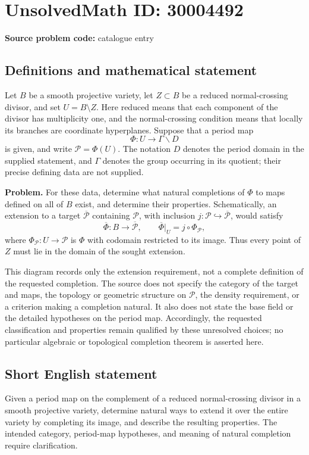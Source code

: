 \documentclass[11pt]{article}
\begin{document}
\section*{UnsolvedMath ID: 30004492}
\textbf{Source problem code:} catalogue entry
\subsection{Definitions and mathematical statement}
Let \(B\) be a smooth projective variety, let \(Z\subset B\) be a reduced normal-crossing divisor, and set \(U=B\setminus Z\). Here reduced means that each component of the divisor has multiplicity one, and the normal-crossing condition means that locally its branches are coordinate hyperplanes. Suppose that a period map
\[
\Phi:U\longrightarrow\Gamma\backslash D
\]
is given, and write \(\mathcal P=\Phi(U)\). The notation \(D\) denotes the period domain in the supplied statement, and \(\Gamma\) denotes the group occurring in its quotient; their precise defining data are not supplied.

\textbf{Problem.} For these data, determine what natural completions of \(\Phi\) to maps defined on all of \(B\) exist, and determine their properties. Schematically, an extension to a target \(\overline{\mathcal P}\) containing \(\mathcal P\), with inclusion \(j:\mathcal P\hookrightarrow\overline{\mathcal P}\), would satisfy
\[
\overline\Phi:B\longrightarrow\overline{\mathcal P},
\qquad
\overline\Phi|_U=j\circ\Phi_{\mathcal P},
\]
where \(\Phi_{\mathcal P}:U\to\mathcal P\) is \(\Phi\) with codomain restricted to its image. Thus every point of \(Z\) must lie in the domain of the sought extension.

This diagram records only the extension requirement, not a complete definition of the requested completion. The source does not specify the category of the target and maps, the topology or geometric structure on \(\mathcal P\), the density requirement, or a criterion making a completion natural. It also does not state the base field or the detailed hypotheses on the period map. Accordingly, the requested classification and properties remain qualified by these unresolved choices; no particular algebraic or topological completion theorem is asserted here.
\subsection{Short English statement}
Given a period map on the complement of a reduced normal-crossing divisor in a smooth projective variety, determine natural ways to extend it over the entire variety by completing its image, and describe the resulting properties. The intended category, period-map hypotheses, and meaning of natural completion require clarification.
\end{document}
